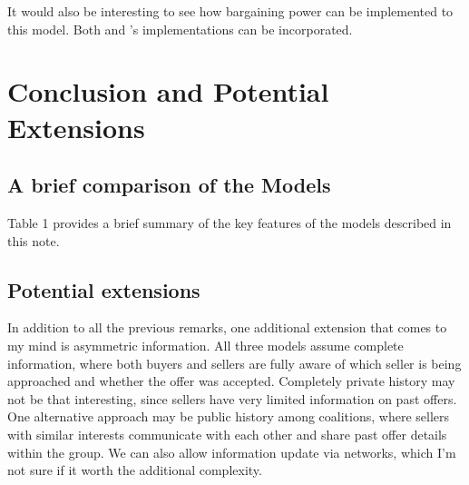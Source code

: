 \documentclass[ProjectGAZ]{subfiles}
\begin{document}
It would also be interesting to see how bargaining power can be implemented to this model. Both \cite{Xiao} and \cite{InOCoHoldUP}'s implementations can be incorporated.

\section{Conclusion and Potential Extensions}

\subsection{A brief comparison of the Models}

Table 1 provides a brief summary of the key features of the models described in this note.


\subsection{Potential extensions}

In addition to all the previous remarks, one additional extension that comes to my mind is asymmetric information. All three models assume complete information, where both buyers and sellers are fully aware of which seller is being approached and whether the offer was accepted.
Completely private history may not be that interesting, since sellers have very limited information on past offers. One alternative approach may be public history among coalitions, where sellers with similar interests communicate with each other and share past offer details within the group. We can also allow information update via networks, which I'm not sure if it worth the additional complexity.


\newpage





\onlyinsubfile{}
%
\end{document}
